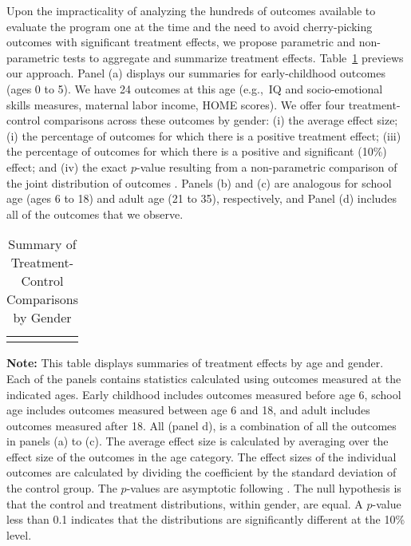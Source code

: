 Upon the impracticality of analyzing the hundreds of outcomes available to evaluate the program one at the time and the need to avoid cherry-picking outcomes with significant treatment effects, we propose parametric and non-parametric tests to aggregate and summarize treatment effects. Table~\ref{table:summary} previews our approach. Panel (a) displays our summaries for early-childhood outcomes (ages 0 to 5). We have 24 outcomes at this age (e.g.,\ IQ and socio-emotional skills measures, maternal labor income, HOME scores). We offer four treatment-control comparisons across these outcomes by gender: (i) the average effect size; (i) the percentage of outcomes for which there is a positive treatment effect; (iii) the percentage of outcomes for which there is a positive and significant (10\%) effect; and (iv) the exact $p$-value resulting from a non-parametric comparison of the joint distribution of outcomes \citep{Rosenbaum_2005_Distribution_JRSS}. Panels (b) and (c) are analogous for school age (ages 6 to 18) and adult age (21 to 35), respectively, and Panel (d) includes all of the outcomes that we observe.

\begin{table}[!htpb]
\begin{threeparttable}
\caption{Summary of Treatment-Control Comparisons by Gender} \label{table:summary}
\centering 
\begin{tabularx}{16.5cm}{XcX}
&  & 
\end{tabularx}
\begin{tablenotes}
\footnotesize
\item \textbf{Note:} This table displays summaries of treatment effects by age and gender. Each of the panels contains statistics calculated using outcomes measured at the indicated ages. Early childhood includes outcomes measured before age 6, school age includes outcomes measured between age 6 and 18, and adult includes outcomes measured after 18. All (panel d), is a combination of all the outcomes in panels (a) to (c). The average effect size is calculated by averaging over the effect size of the outcomes in the age category. The effect sizes of the individual outcomes are calculated by dividing the coefficient by the standard deviation of the control group. The $p$-values are asymptotic following \citet{Rosenbaum_2005_Distribution_JRSS}. The null hypothesis is that the control and treatment distributions, within gender, are equal. A $p$-value less than 0.1 indicates that the distributions are significantly different at the 10\% level. 
\end{tablenotes}
\end{threeparttable}
\end{table}

